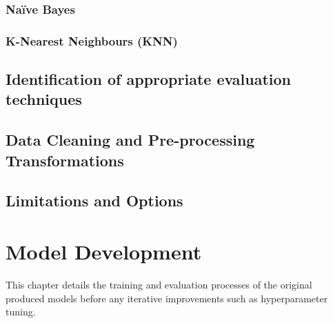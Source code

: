 \documentclass[12pt]{report}
\begin{document}

\subsection{Na\"ive Bayes}

\subsection{K-Nearest Neighbours (KNN)}

\section{Identification of appropriate evaluation techniques}

\section{Data Cleaning and Pre-processing Transformations}\label{sec:Preprocessing}

\section{Limitations and Options}


\chapter{Model Development} %
This chapter details the training and evaluation processes of the original produced models
before any iterative improvements such as hyperparameter tuning.
\end{document}
